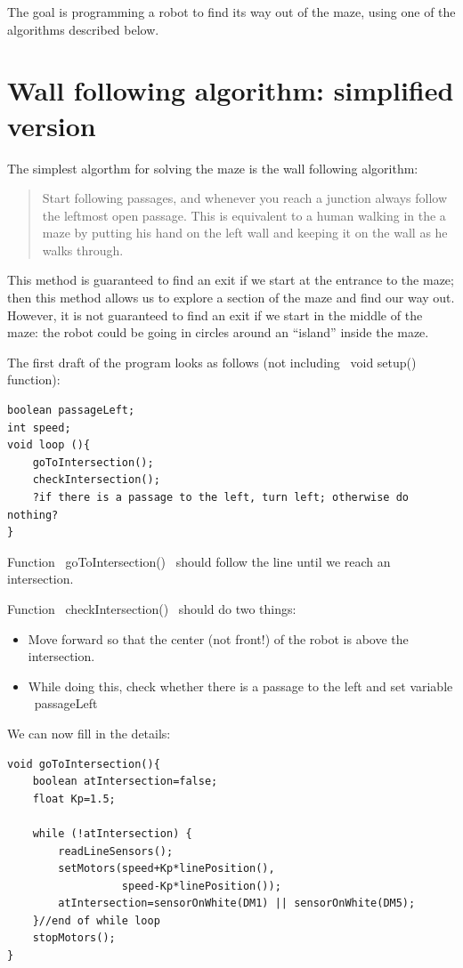 \documentclass[oneside]{stml-l}
\numberwithin{figure}{chapter}
\begin{document}
The goal is  programming a robot to find its way out of the
maze, using one of the  algorithms described below.


\section{Wall  following algorithm: simplified version}
The simplest algorthm for solving the maze is the wall following algorithm:
\begin{quote}
  Start following passages, and whenever
you reach a junction always follow the  leftmost open passage. This
is  equivalent to a human walking in the  a maze by putting his
hand on the left wall and keeping it on the wall as he walks through.
\end{quote}
This method  is guaranteed to find an exit if we start at the entrance
to the maze; then  this method allows us to explore a section
of the maze and find our way out. However, it  is not guaranteed to
find an exit if we start in the middle of the maze: the robot could be
going in circles around an ``island'' inside the maze.

The first draft of the program looks as follows (not including ~void setup()~ function):
\begin{lstlisting}
boolean passageLeft;
int speed;
void loop (){
    goToIntersection();
    checkIntersection();
    ?if there is a passage to the left, turn left; otherwise do nothing?
}
\end{lstlisting}
Function ~goToIntersection()~ should follow the line until we reach an
intersection.

Function ~checkIntersection()~ should do two things:
\begin{itemize}
\item Move forward so that the center (not front!)  of the robot is
above the intersection.
\item While doing this, check whether there is a passage to the left
and set variable ~passageLeft~
\end{itemize}

We can now fill in the details:
\begin{lstlisting}
void goToIntersection(){
    boolean atIntersection=false;
    float Kp=1.5;

    while (!atIntersection) {
        readLineSensors();
        setMotors(speed+Kp*linePosition(),
                  speed-Kp*linePosition());
        atIntersection=sensorOnWhite(DM1) || sensorOnWhite(DM5);
    }//end of while loop
    stopMotors();
}
\end{lstlisting}
\end{document}
